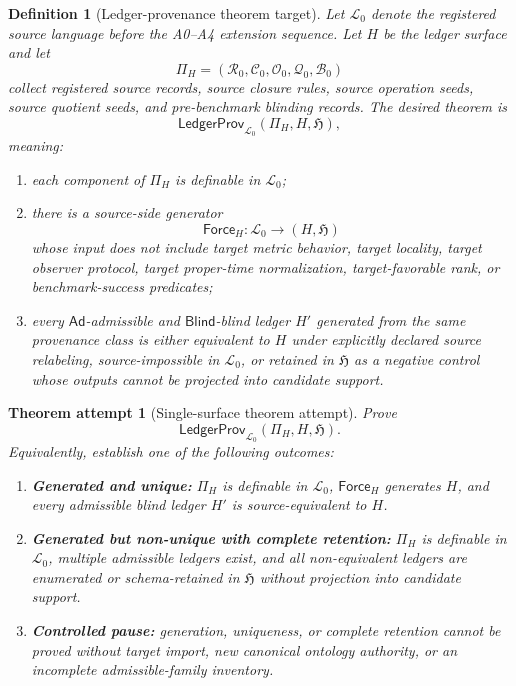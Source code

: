 \documentclass[11pt]{article}
\newcommand{\Lang}{\mathcal{L}_{0}}
\newcommand{\LedgerFam}{\mathfrak{H}}
\newcommand{\Ad}{\mathsf{Ad}}
\newcommand{\Blind}{\mathsf{Blind}}
\newcommand{\ForceH}{\mathsf{Force}_{H}}
\newcommand{\LedgerProv}{\mathsf{LedgerProv}}
\newtheorem{definitionblock}{Definition}
\newtheorem{attempt}{Theorem attempt}
\begin{document}
\begin{definitionblock}[Ledger-provenance theorem target]
Let \(\Lang\) denote the registered source language before the A0--A4
extension sequence. Let \(H\) be the ledger surface and let
\[
\Pi_H=(\mathcal{R}_{0},\mathcal{C}_{0},\mathcal{O}_{0},
\mathcal{Q}_{0},\mathcal{B}_{0})
\]
collect registered source records, source closure rules, source operation
seeds, source quotient seeds, and pre-benchmark blinding records.
The desired theorem is
\[
\LedgerProv_{\Lang}(\Pi_H,H,\LedgerFam),
\]
meaning:
\begin{enumerate}
    \item each component of \(\Pi_H\) is definable in \(\Lang\);
    \item there is a source-side generator
    \[
    \ForceH:\Lang\longrightarrow (H,\LedgerFam)
    \]
    whose input does not include target metric behavior, target locality,
    target observer protocol, target proper-time normalization,
    target-favorable rank, or benchmark-success predicates;
    \item every \(\Ad\)-admissible and \(\Blind\)-blind ledger \(H'\)
    generated from the same provenance class is either equivalent to \(H\)
    under explicitly declared source relabeling, source-impossible in
    \(\Lang\), or retained in \(\LedgerFam\) as a negative control whose
    outputs cannot be projected into candidate support.
\end{enumerate}
\end{definitionblock}

\begin{attempt}[Single-surface theorem attempt]
Prove
\[
\LedgerProv_{\Lang}(\Pi_H,H,\LedgerFam).
\]
Equivalently, establish one of the following outcomes:
\begin{enumerate}
    \item \textbf{Generated and unique:} \(\Pi_H\) is definable in
    \(\Lang\), \(\ForceH\) generates \(H\), and every admissible blind
    ledger \(H'\) is source-equivalent to \(H\).
    \item \textbf{Generated but non-unique with complete retention:}
    \(\Pi_H\) is definable in \(\Lang\), multiple admissible ledgers exist,
    and all non-equivalent ledgers are enumerated or schema-retained in
    \(\LedgerFam\) without projection into candidate support.
    \item \textbf{Controlled pause:} generation, uniqueness, or complete
    retention cannot be proved without target import, new canonical
    ontology authority, or an incomplete admissible-family inventory.
\end{enumerate}
\end{attempt}
\end{document}

